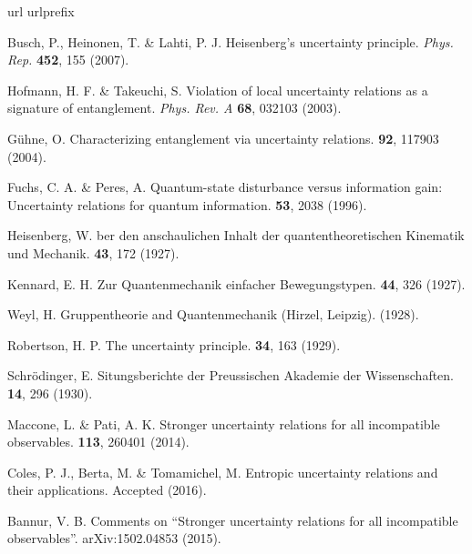 \documentclass[fleqn,10pt]{wlscirep}
\begin{document}
%
\begin{thebibliography}{10}
\expandafter\ifx\csname url\endcsname\relax\def\url#1{\texttt{#1}}\fi
\expandafter\ifx\csname urlprefix\endcsname\relax\def\urlprefix{URL }\fi
\providecommand{\bibinfo}[2]{#2}
\providecommand{\eprint}[2][]{\url{#2}}

 Busch, P., Heinonen, T. \& Lahti, P. J. Heisenberg's uncertainty principle.
{\em Phys. Rep.} \textbf{452}, 155 (2007).

 Hofmann, H. F. \& Takeuchi, S.
Violation of local uncertainty relations as a signature of entanglement.
{\em Phys. Rev. A} {\bf 68}, 032103 (2003).

 G\"{u}hne, O.
\newblock Characterizing entanglement via uncertainty relations.
 {\bf 92}, 117903 (2004).

 Fuchs, C. A. \& Peres, A.
\newblock Quantum-state disturbance versus information gain: Uncertainty relations for quantum information.
 {\bf 53}, 2038 (1996).

 Heisenberg, W.
ber den anschaulichen {I}nhalt der quantentheoretischen
  {K}inematik und {M}echanik.
 {\bf43}, 172 (1927).

 Kennard, E. H.
\newblock Zur {Q}uantenmechanik einfacher {B}ewegungstypen.
 {\bf44}, 326 (1927).


 Weyl, H.
\newblock Gruppentheorie and Quantenmechanik (Hirzel, Leipzig). (1928).


 Robertson, H. P.
\newblock The uncertainty principle.
 {\bf34}, 163 (1929).


 Schr\"odinger, E.
\newblock Situngsberichte der Preussischen Akademie der Wissenschaften.
 {\bf 14}, 296 (1930).

 Maccone, L. \& Pati, A. K.
\newblock Stronger uncertainty relations for all incompatible observables.
 {\bf 113}, 260401 (2014).

 Coles, P. J., Berta, M. \& Tomamichel, M.
\newblock Entropic uncertainty relations and their applications.
  Accepted (2016).

 Bannur, V. B.
\newblock Comments on ``Stronger uncertainty relations for all incompatible observables''.
 arXiv:1502.04853 (2015).


\end{thebibliography}
\end{document}
